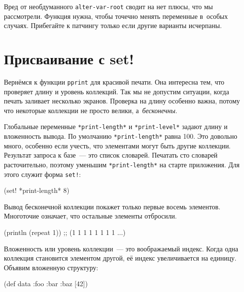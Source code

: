 Вред от необдуманного \verb|alter-var-root| сводит на нет плюсы, что мы
рассмотрели. Функция нужна, чтобы точечно менять переменные в~особых
случаях. Прибегайте к патчингу только если другие варианты исчерпаны.

\section{Присваивание с set!}


Вернёмся к функции \verb|pprint| для красивой печати. Она интересна тем, что
проверяет длину и уровень коллекций. Так мы не допустим ситуации, когда печать
заливает несколько экранов. Проверка на длину особенно важна, потому что
некоторые коллекции не просто велики, а~\emph{бесконечны}.


Глобальные переменные \verb|*print-length*| и \verb|*print-level*| задают длину
и вложенность вывода. По умолчанию \verb|*print-length*| равна 100. Это довольно
много, особенно если учесть, что элементами могут быть другие
коллекции. Результат запроса к базе~--- это список словарей. Печатать сто словарей
расточительно, поэтому уменьшим \verb|*print-length*| на старте приложения. Для
этого служит форма \verb|set!|:

\begin{english}
  \begin{clojure}
(set! *print-length* 8)
  \end{clojure}
\end{english}

Вывод бесконечной коллекции покажет только первые восемь элементов. Многоточие
означает, что остальные элементы отбросили.

\begin{english}
  \begin{clojure}
(println (repeat 1))
;; (1 1 1 1 1 1 1 1 ...)
  \end{clojure}
\end{english}

Вложенность или уровень коллекции~--- это воображаемый индекс. Когда одна коллекция
становится элементом другой, её индекс увеличивается на единицу. Объявим
вложенную структуру:

\begin{english}
  \begin{clojure}
(def data {:foo
            {:bar
              {:baz [42]}}})
  \end{clojure}
\end{english}

